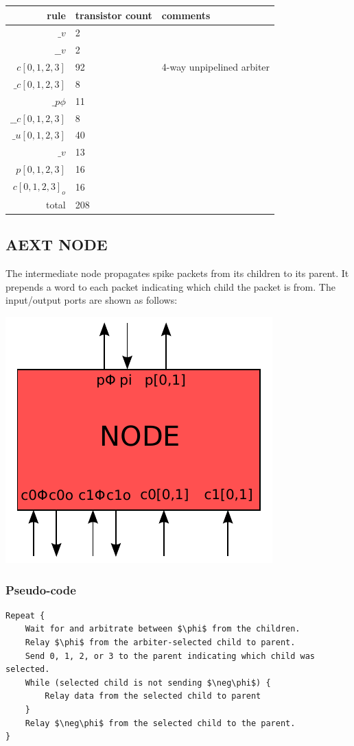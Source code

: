 \documentclass{article}
\begin{document}
\begin{center}
    \begin{tabular}{|r|l|l|}
    \hline
    rule & transistor count & comments \\ \hline
    $\_v$ & 2 & \\ \hline
    $\_\_v$ & 2 & \\ \hline
    $c[0,1,2,3]$ & 92 & 4-way unpipelined arbiter \\ \hline
    $\_c[0,1,2,3]$ & 8 & \\ \hline
    $\_p\phi$ & 11 & \\ \hline
    $\_\_c[0,1,2,3]$ & 8 & \\ \hline
    $\_u[0,1,2,3]$ & 40 & \\ \hline
    $\_v$ & 13 & \\ \hline
    $p[0,1,2,3]$ & 16 & \\ \hline
    $c[0,1,2,3]_o$ & 16 & \\ \hline
    \hline total & 208 & \\ \hline
    \end{tabular}
\end{center}

\subsection{AEXT NODE \label{sec:AEXT_NODE}}

The intermediate node propagates spike packets from its children to its parent.
It prepends a word to each packet indicating which child the packet is from. 
The input/output ports are shown as follows:

\begin{center}
  \includegraphics[width=.25\textwidth]{img/aext_node.pdf}
\end{center}

\subsubsection*{Pseudo-code}

\begin{lstlisting}[mathescape]
Repeat {
    Wait for and arbitrate between $\phi$ from the children.
    Relay $\phi$ from the arbiter-selected child to parent.
    Send 0, 1, 2, or 3 to the parent indicating which child was selected.
    While (selected child is not sending $\neg\phi$) {
        Relay data from the selected child to parent
    }
    Relay $\neg\phi$ from the selected child to the parent.
}
\end{lstlisting}
\end{document}
